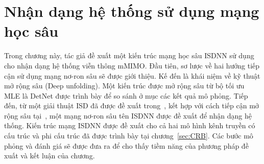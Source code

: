 \clearpage
{}

\setcounter{chapter}{2}
\chapter[NHẬN DẠNG HỆ THỐNG SỬ DỤNG MẠNG HỌC SÂU]{Nhận dạng hệ thống sử dụng mạng học sâu}
\label{sec:ML}

Trong chương này, tác giả đề xuất một kiến trúc mạng học sâu ISDNN sử dụng cho nhận dạng hệ thống viễn thông mMIMO. Đầu tiên, sơ lược về hai hướng tiếp cận sử dụng mạng nơ-ron sâu sẽ được giới thiệu. Kế đến là khái niệm về kỹ thuật mở rộng sâu (Deep unfolding). Một kiến trúc được mở rộng sâu từ bộ tối ưu MLE là DetNet được trình bày để so sánh ở mục các kết quả mô phỏng. Tiếp đến, từ một giải thuật ISD đã được đề xuất trong~\cite{Mandloi2017}, kết hợp với cách tiếp cận mở rộng sâu tại~\cite{Liao2020}, một mạng nơ-ron sâu tên ISDNN được đề xuất để nhận dạng hệ thống. Kiến trúc mạng ISDNN được đề xuất cho cả hai mô hình kênh truyền có cấu trúc và phi cấu trúc đã được trình bày tại chương~\ref{sec:CRB}. Các bước mô phỏng và đánh giá sẽ được đưa ra để cho thấy tiềm năng của phương pháp đề xuất và kết luận của chương. 

